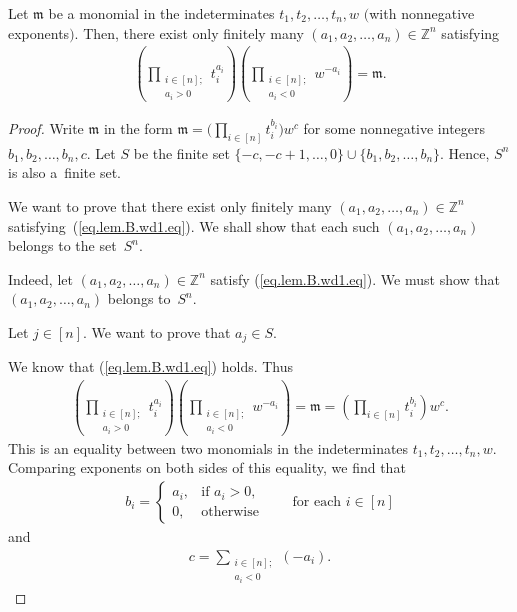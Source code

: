 \begin{Lemma}\label{lem.B.wd1}Let $\mathfrak{m}$ be a monomial in the indeterminates $t_{1},t_{2},\ldots,t_{n},w$ $($with nonnegative exponents$)$. Then, there exist only finitely many $( a_{1},a_{2},\ldots,a_{n}) \in\mathbb{Z}^{n}$ satisfying
\begin{gather}
\left( \prod_{\substack{i\in[n] ;\\a_{i}>0}}t_{i}^{a_{i}}\right) \left( \prod_{\substack{i\in[n] ;\\a_{i}<0}}w^{-a_{i}}\right) =\mathfrak{m}. \label{eq.lem.B.wd1.eq}
\end{gather}
\end{Lemma}

\begin{proof} Write $\mathfrak{m}$ in the form $\mathfrak{m}=\Big( \prod_{i\in[n] }t_{i}^{b_{i}}\Big) w^{c}$ for some nonnegative integers $b_{1},b_{2},\ldots,b_{n},c$. Let $S$ be the finite set $ \{ -c,-c+1,\ldots,0 \} \cup \{ b_{1} ,b_{2},\ldots,b_{n} \} $. Hence, $S^{n}$ is also a~finite set.

We want to prove that there exist only finitely many $ ( a_{1},a_{2},\ldots,a_{n} ) \in\mathbb{Z}^{n}$ satisfying~(\ref{eq.lem.B.wd1.eq}). We shall show that each such $ ( a_{1},a_{2},\ldots,a_{n} ) $ belongs to the set~$S^{n}$.

Indeed, let $ ( a_{1},a_{2},\ldots,a_{n} ) \in\mathbb{Z}^{n}$ satisfy (\ref{eq.lem.B.wd1.eq}). We must show that $ ( a_{1},a_{2},\ldots,a_{n} ) $ belongs to~$S^{n}$.

Let $j\in[n] $. We want to prove that $a_{j}\in S$.

We know that (\ref{eq.lem.B.wd1.eq}) holds. Thus
\begin{gather*}
\left( \prod_{\substack{i\in[n] ;\\a_{i}>0}}t_{i}^{a_{i}}\right) \left( \prod_{\substack{i\in[n] ;\\a_{i}<0}}w^{-a_{i}}\right) =\mathfrak{m}=\left( \prod_{i\in[n] }t_{i}^{b_{i}}\right) w^{c}.
\end{gather*}
This is an equality between two monomials in the indeterminates $t_{1},t_{2},\ldots,t_{n},w$. Comparing exponents on both sides of this equality, we find that
\begin{gather}
b_{i}=
\begin{cases}
a_{i}, & \text{if }a_{i}>0,\\
0, & \text{otherwise}
\end{cases}
\qquad \text{for each }i\in[n] \label{pf.lem.B.wd1.bi=}
\end{gather}
and
\begin{gather}
c=\sum_{\substack{i\in[n] ;\\a_{i}<0}} ( -a_{i} ) .\label{pf.lem.B.wd1.c=}
\end{gather}


\end{proof}
